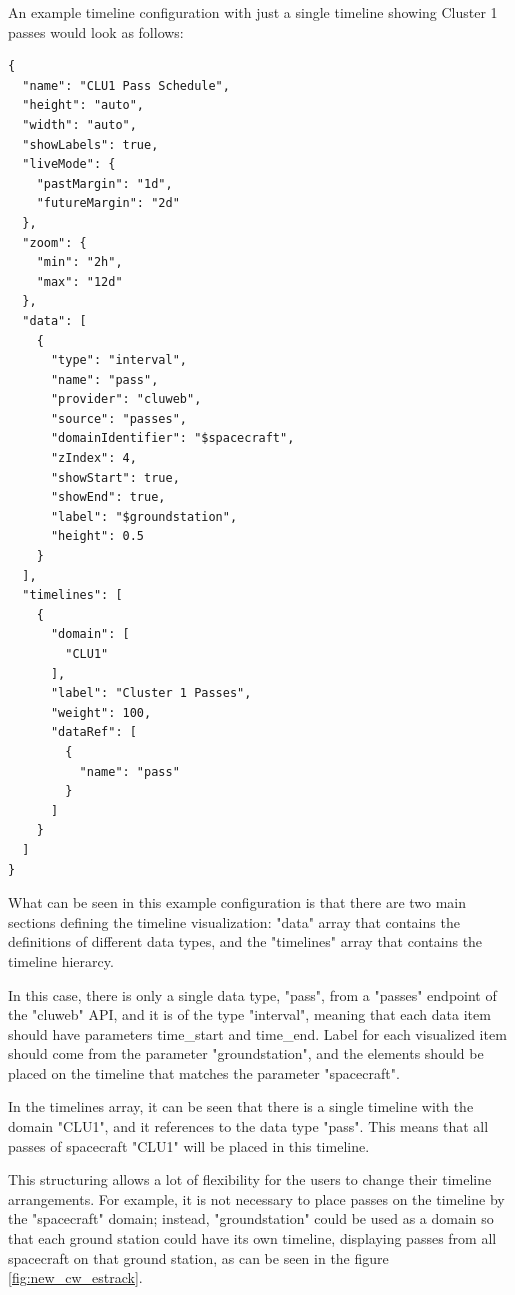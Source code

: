 An example timeline configuration with just a single timeline showing Cluster 1 passes would look as follows:

\begin{verbatim}
{
  "name": "CLU1 Pass Schedule",
  "height": "auto",
  "width": "auto",
  "showLabels": true,
  "liveMode": {
    "pastMargin": "1d",
    "futureMargin": "2d"
  },
  "zoom": {
    "min": "2h",
    "max": "12d"
  },
  "data": [
    {
      "type": "interval",
      "name": "pass",
      "provider": "cluweb",
      "source": "passes",
      "domainIdentifier": "$spacecraft",
      "zIndex": 4,
      "showStart": true,
      "showEnd": true,
      "label": "$groundstation",
      "height": 0.5
    }
  ],
  "timelines": [
    {
      "domain": [
        "CLU1"
      ],
      "label": "Cluster 1 Passes",
      "weight": 100,
      "dataRef": [
        {
          "name": "pass"
        }
      ]
    }
  ]
}
\end{verbatim}

What can be seen in this example configuration is that there are two main sections defining the timeline visualization: "data" array that contains the definitions of different data types, and the "timelines" array that contains the timeline hierarcy.

In this case, there is only a single data type, "pass", from a "passes" endpoint of the "cluweb" API, and it is of the type "interval", meaning that each data item should have parameters time\_start and time\_end. Label for each visualized item should come from the parameter "groundstation", and the elements should be placed on the timeline that matches the parameter "spacecraft".

In the timelines array, it can be seen that there is a single timeline with the domain "CLU1", and it references to the data type "pass". This means that all passes of spacecraft "CLU1" will be placed in this timeline.

This structuring allows a lot of flexibility for the users to change their timeline arrangements. For example, it is not necessary to place passes on the timeline by the "spacecraft" domain; instead, "groundstation" could be used as a domain so that each ground station could have its own timeline, displaying passes from all spacecraft on that ground station, as can be seen in the figure \ref{fig:new_cw_estrack}.

